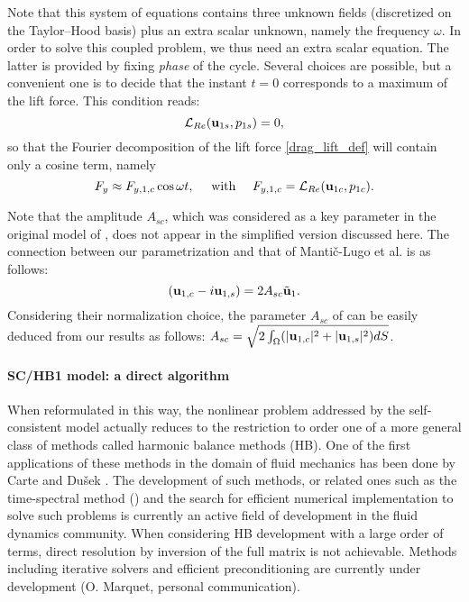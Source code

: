 \documentclass[twocolumn,10pt]{asme2ej}
\newcommand{\be}[1]{ \begin{equation} \label{#1}}
\newcommand{\ee}{\end{equation}}
\begin{document}

Note that this system of equations contains three unknown fields (discretized on the Taylor--Hood basis) plus an extra scalar unknown, 
namely the frequency $\omega$. 
In order to solve this coupled problem, we thus need an extra scalar equation. The latter is provided by fixing {\em phase} of the cycle. Several choices are possible, but a convenient one is to decide that the instant $t=0$ corresponds to a maximum of the lift force.
This condition reads:
\be{HBphase}
{\cal L}_{Re}({\bf u}_{1s},p_{1s}) =0, 
\ee
so that the Fourier decomposition of the lift force \ref{drag_lift_def} will contain only a cosine term, namely 
\be{FySC}
F_y \approx F_{y,1,c} \cos \omega t, \quad \mbox{ with } \quad F_{y,1,c} = {\cal L}_{Re}({\bf u}_{1c},p_{1c}).
\ee 


Note that the amplitude $A_{sc}$, which was considered as a key parameter in the original model of \cite{MLugo2014}, 
does not appear in the simplified version discussed here. The connection between our parametrization and that of Manti\v{c}-Lugo et al. is as follows:
\be{HBtoSC}
\left( {\bf u }_{1,c} - i {\bf u }_{1,s} \right) = 2 A_{sc} \tilde{{\bf u }}_1.
\ee 
Considering their normalization choice, the parameter $A_{sc}$ of \cite{MLugo2014} can be easily deduced from our results as follows:
$A_{sc} = \sqrt{2 \int_\Omega ( |{\bf u }_{1,c}|^2+ |{\bf u }_{1,s}|^2) d S} $.








\paragraph{SC/HB1 model: a direct algorithm }


When reformulated in this way, the nonlinear problem addressed by the self-consistent model actually reduces to the restriction to order one of a more general class of methods called harmonic balance methods (HB).
One of the first applications of these methods in the domain of fluid mechanics has been done by Carte and Du\v{s}ek \cite{CarteDusek1995,CarteDusekfraunie1996}.
The development of such methods, or related ones such as the time-spectral method (\cite{HallThomasClark2002}) and the search for efficient numerical implementation to solve such problems is currently an active field of development in the fluid dynamics community.
When considering HB development with a large order of terms, direct resolution by inversion of the full matrix is not achievable. Methods including iterative solvers and efficient preconditioning are currently under development (O. Marquet, personal communication). 
\end{document}
